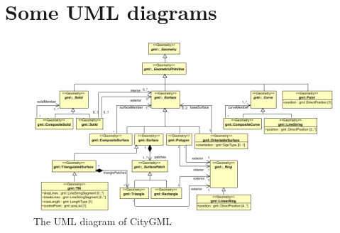 \chapter{Some UML diagrams}

\begin{figure}
  \centering
  \includegraphics[angle=90,width=0.9\linewidth]{figs/citygmlgeom.pdf}
  \caption{The UML diagram of CityGML}
\label{fig:citygmlgeom}
\end{figure}